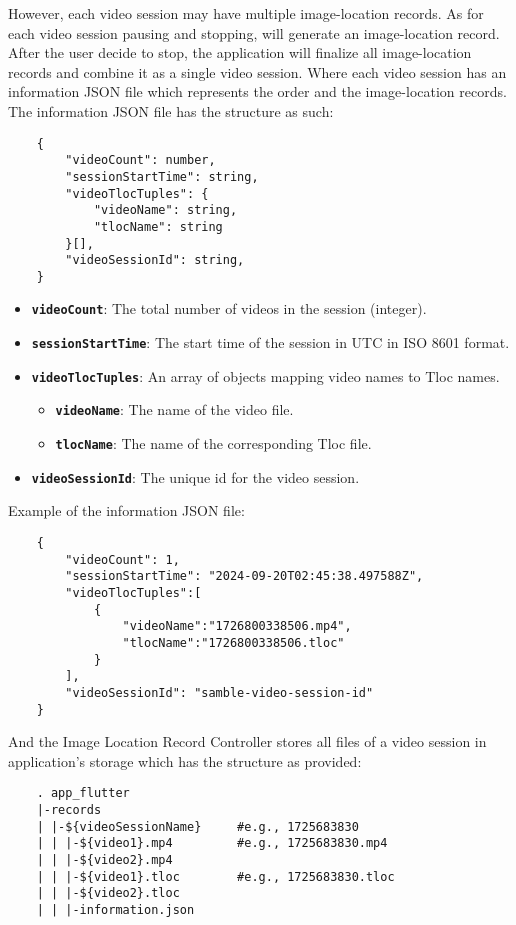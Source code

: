 \begin{enumerate}
However, each video session may have multiple image-location records. As for each video session pausing and stopping, will generate an image-location record. After the user decide to stop, the application will finalize all image-location records and combine it as a single video session. Where each video session has an information JSON file which represents the order and the image-location records. The information JSON file has the structure as such:
\begin{lstlisting}
    {
        "videoCount": number,
        "sessionStartTime": string,
        "videoTlocTuples": {
            "videoName": string, 
            "tlocName": string 
        }[],
        "videoSessionId": string,
    }
\end{lstlisting}
\begin{itemize}
    \item \textbf{\texttt{videoCount}}: The total number of videos in the session (integer).
    \item \textbf{\texttt{sessionStartTime}}: The start time of the session in UTC in ISO 8601 format.
    \item \textbf{\texttt{videoTlocTuples}}: An array of objects mapping video names to Tloc names.
    \begin{itemize}
        \item \textbf{\texttt{videoName}}: The name of the video file.
        \item \textbf{\texttt{tlocName}}: The name of the corresponding Tloc file.
    \end{itemize}
    \item \textbf{\texttt{videoSessionId}}: The unique id for the video session.
\end{itemize}
Example of the information JSON file:
\begin{lstlisting}
    {
        "videoCount": 1,
        "sessionStartTime": "2024-09-20T02:45:38.497588Z",
        "videoTlocTuples":[
            {
                "videoName":"1726800338506.mp4",
                "tlocName":"1726800338506.tloc"
            }
        ],
        "videoSessionId": "samble-video-session-id"
    }
\end{lstlisting}
And the Image Location Record Controller stores all files of a video session in application's storage which has the structure as provided:
\begin{lstlisting}
    . app_flutter
    |-records
    | |-${videoSessionName}     #e.g., 1725683830
    | | |-${video1}.mp4         #e.g., 1725683830.mp4
    | | |-${video2}.mp4
    | | |-${video1}.tloc        #e.g., 1725683830.tloc
    | | |-${video2}.tloc
    | | |-information.json
\end{lstlisting}
\end{enumerate}

